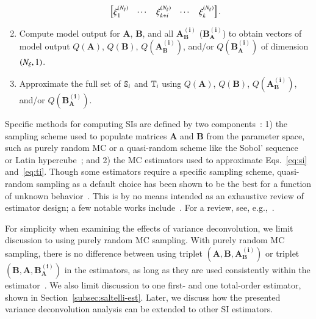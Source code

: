 \begin{enumerate}
\begin{equation}
\begin{bmatrix}
        \xi_1^{(\Nxi)} & \cdots & \xi_{k+i}^{(\Nxi)}   & \cdots & \xi_k^{(\Nxi)}  \\
        \end{bmatrix} .
    \end{equation}
    \item Compute model output for $\bm{A}$, $\bm{B}$, and all $\bm{A_B^{(i)}}$ ($\bm{B_A^{(i)}}$) to obtain vectors of model output $Q(\bm{A})$, $Q(\bm{B})$, $Q(\bm{A_B^{(i)}})$, and/or $Q(\bm{B_A^{(i)}})$ of dimension $(\Nxi,1)$. 
    \item Approximate the full set of $\S{i}$ and $\T{i}$ using $Q(\bm{A})$, $Q(\bm{B})$, $Q(\bm{A_B^{(i)}})$, and/or $Q(\bm{B_A^{(i)}})$.
\end{enumerate}
Specific methods for computing SIs are defined by two components~\cite{piano-etal-2021}: 1) the sampling scheme used to populate matrices $\bm{A}$ and $\bm{B}$ from the parameter space, such as purely random MC or a quasi-random scheme like the Sobol' sequence~\cite{sobol-1967, sobol-1976} or Latin hypercube~\cite{mckay-etal-1979}; and 2) the MC estimators used to approximate Eqs.~\eqref{eq:si} and~\eqref{eq:ti}. 
Though some estimators require a specific sampling scheme, quasi-random sampling as a default choice has been shown to be the best for a function of unknown behavior~\cite{kucherenko-etal-2015, sensobol-2022}.
This is by no means intended as an exhaustive review of estimator design; a few notable works include~\cite{saltelli-etal-2008, sobol-1993, homma-saltelli-1996, saltelli-2002, saltelli-etal-2010, glen-isaacs-2012, janon-etal-2014, lilburne-tarantola-2009, mara-joseph-2008, mckay-1995, owen-2013, plischke-etal-2013, ratto-etal-2007, sobol-etal-2007, jansen-1999, azzini-etal-2020b, sobol-2001, monod-etal-2006, razavi-gupta-2016a, razavi-gupta-2016b}. 
For a review, see, e.g.,~\cite{saltelli-etal-2010, puy-etal-2022}.

For simplicity when examining the effects of variance deconvolution, we limit discussion to using purely random MC sampling. 
With purely random MC sampling, there is no difference between using triplet $\left( \bm{A}, \bm{B}, \bm{A_B^{(i)}} \right)$ or triplet $\left( \bm{B}, \bm{A}, \bm{B_A^{(i)}} \right)$ in the estimators, as long as they are used consistently within the estimator~\cite{saltelli-etal-2010}.
We also limit discussion to one first- and one total-order estimator, shown in Section~\ref{subsec:saltelli-est}. 
Later, we discuss how the presented variance deconvolution analysis can be extended to other SI estimators. 

